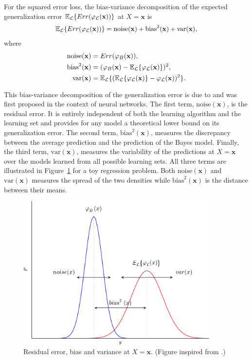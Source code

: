 \begin{theorem}\label{thm:bias-variance}
For the squared error loss, the bias-variance decomposition of the expected
generalization error $\mathbb{E}_{\cal L} \{ Err(\varphi_{\cal L}(\mathbf{x}))
\}$ at $X=\mathbf{x}$ is
\begin{equation}
\mathbb{E}_{\cal L} \{ Err(\varphi_{\cal L}(\mathbf{x})) \} = \text{noise}(\mathbf{x}) + \text{bias}^2(\mathbf{x}) + \text{var}(\mathbf{x}),
\end{equation}
where
\begin{align*}
\text{noise}(\mathbf{x}) &= Err(\varphi_B(\mathbf{x})), \\
\text{bias}^2(\mathbf{x}) &= (\varphi_B(\mathbf{x}) - \mathbb{E}_{\cal L} \{ \varphi_{\cal L}(\mathbf{x}) \} )^2, \\
\text{var}(\mathbf{x}) &= \mathbb{E}_{\cal L} \{ (\mathbb{E}_{\cal L} \{ \varphi_{\cal L}(\mathbf{x}) \} - \varphi_{\cal L}(\mathbf{x}))^2 \}.
\end{align*}
\end{theorem}

This bias-variance decomposition of the generalization error is due to
\citet{geman:1992} and was first proposed in the context of neural networks.
The first term, $\text{noise}(\mathbf{x})$, is the residual error. It is
entirely independent of both the learning algorithm and the learning set and
provides for any model a theoretical lower bound on its generalization error.
The second term, $\text{bias}^2(\mathbf{x})$, measures the discrepancy between
the average prediction and the prediction of the Bayes model. Finally, the
third term, $\text{var}(\mathbf{x})$, measures the variability of the
predictions at $X=\mathbf{x}$ over the models learned from all possible
learning sets. All three terms are illustrated in Figure~\ref{fig:bias-variance}
for a toy regression problem. Both $\text{noise}(\mathbf{x})$ and
$\text{var}(\mathbf{x})$ measures the spread of the two densities while
$\text{bias}^2(\mathbf{x})$ is the distance between their means.

\begin{figure}
    \centering
    \includegraphics[width=0.9\textwidth]{figures/ch4_bias_variance.pdf}
    \caption{Residual error, bias and variance at $X=\mathbf{x}$. (Figure inspired from \citep{geurts:2002}.)}
    \label{fig:bias-variance}
\end{figure}

